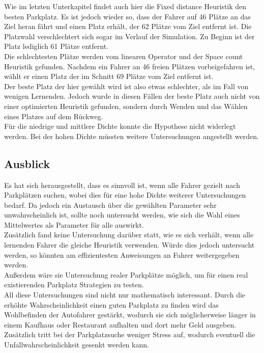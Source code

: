 Wie im letzten Unterkapitel findet auch hier die Fixed distance Heuristik den besten Parkplatz.
Es ist jedoch wieder so, dass der Fahrer auf 46 Plätze an das Ziel heran fährt und einen Platz erhält, der 62 Plätze vom Ziel entfernt ist. Die Platzwahl verschlechtert sich sogar im Verlauf der Simulation. Zu Beginn ist der Platz lediglich 61 Plätze entfernt.\\
Die schlechtesten Plätze werden vom linearen Operator %
und der Space count Heuristik gefunden.
Nachdem ein Fahrer an 46 freien Plätzen vorbeigefahren ist, wählt er einen Platz der im Schnitt 69 Plätze vom Ziel entfernt ist.\\

Der beste Platz der hier gewählt wird ist also etwas schlechter, als im Fall von wenigen Lernenden. Jedoch wurde in diesen Fällen der beste Platz auch nicht von einer optimierten Heuristik gefunden, sondern durch Wenden und das Wählen eines Platzes auf dem Rückweg.\\
Für die niedrige und mittlere Dichte konnte die Hypothese nicht widerlegt werden. Bei der hohen Dichte müssten weitere Untersuchungen angestellt werden.

\subsection{Ausblick}

Es hat sich herausgestellt, dass es sinnvoll ist, wenn alle Fahrer gezielt nach Parkplätzen suchen, wobei dies für eine hohe Dichte weiterer Untersuchungen bedarf. Da jedoch ein Austausch über die gewählten Parameter sehr unwahrscheinlich ist, sollte noch untersucht werden, wie sich die Wahl eines Mittelwertes als Parameter für alle auswirkt.\\
Zusätzlich fand keine Untersuchung darüber statt, wie es sich verhält, wenn alle lernenden Fahrer die gleiche Heuristik verwenden. Würde dies jedoch untersucht werden, so könnten am effizientesten Anweisungen an Fahrer weitergegeben werden. \\
Außerdem wäre sie Untersuchung realer Parkplätze möglich, um für einen real existierenden Parkplatz Strategien zu testen.\\
All diese Untersuchungen sind nicht nur mathematisch interessant. Durch die erhöhte Wahrscheinlichkeit einen guten Parkplatz zu finden wird das Wohlbefinden der Autofahrer gestärkt, wodurch sie sich möglicherweise länger in einem Kaufhaus oder Restaurant aufhalten und dort mehr Geld ausgeben. Zusätzlich tritt bei der Parkplatzsuche weniger Stress auf, wodurch eventuell die Unfallwahrscheinlichkeit gesenkt werden kann.